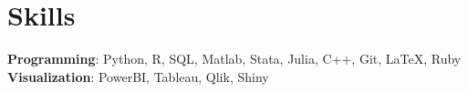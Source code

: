 
\section{Skills}
\textbf{Programming}: Python, R, SQL, Matlab, Stata, Julia, C++, Git, \LaTeX, Ruby\\
\textbf{Visualization}: PowerBI, Tableau, Qlik, Shiny
